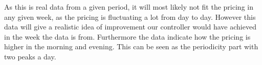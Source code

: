 As this is real data from a given period, it will most likely not fit the pricing in any given week, as the pricing is fluctuating a lot from day to day. However this data will give a realistic idea of improvement our controller would have achieved in the week the data is from. Furthermore the data indicate how the pricing is higher in the morning and evening. This can be seen as the periodicity part with two peaks a day.


